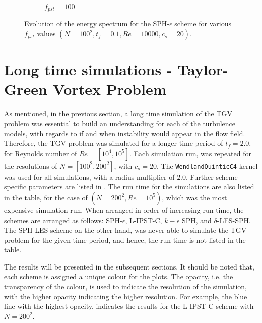 \begin{figure}[htbp!]
\begin{subfigure}{7cm}
  \caption{$f_{pst} = 100$}
  \end{subfigure}
  \caption{Evolution of the energy spectrum for the SPH-$\epsilon$ scheme for various $f_{pst}$ values $(N=100^2, t_f=0.1, Re=10000, c_s=20)$.}
  \label{fig:sph-eps-pst-espec}
\end{figure}


\section{Long time simulations - Taylor-Green Vortex Problem}
As mentioned, in the previous section, a long time simulation of the TGV problem was essential to build an understanding for each of the turbulence models, with regards to if and when instability would appear in the flow field.
Therefore, the TGV problem was simulated for a longer time period of $t_f = 2.0$, for Reynolds number of $Re=[10^4, 10^5]$. Each simulation run, was repeated for the resolutions of $N=[100^2, 200^2]$, with $c_s=20$. The \texttt{WendlandQuinticC4} kernel was used for all simulations, with a radius multiplier of $2.0$. 
Further scheme-specific parameters are listed in .
The run time for the simulations are also listed in the table, for the case of $(N=200^2, Re=10^5)$, which was the most expensive simulation run.
When arranged in order of increasing run time, the schemes are arranged as follows: SPH-$\epsilon$, L-IPST-C, $k-\epsilon$ SPH, and $\delta$-LES-SPH.
The SPH-LES scheme on the other hand, was never able to simulate the TGV problem for the given time period, and hence, the run time is not listed in the table.

The results will be presented in the subsequent sections. It should be noted that, each scheme is assigned a unique colour for the plots. The opacity, i.e. the transparency of the colour, is used to indicate the resolution of the simulation, with the higher opacity indicating the higher resolution. For example, the blue line with the highest opacity, indicates the results for the L-IPST-C scheme with $N=200^2$.

